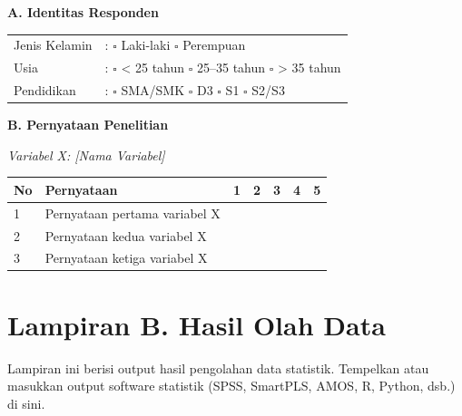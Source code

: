 \vspace{0.5cm}

\noindent\textbf{A. Identitas Responden}

\vspace{0.3cm}

\noindent
\begin{tabular}{ll}
Jenis Kelamin & : $\square$ Laki-laki \quad $\square$ Perempuan \\[0.3cm]
Usia          & : $\square$ < 25 tahun \quad $\square$ 25--35 tahun \quad $\square$ > 35 tahun \\[0.3cm]
Pendidikan    & : $\square$ SMA/SMK \quad $\square$ D3 \quad $\square$ S1 \quad $\square$ S2/S3 \\
\end{tabular}

\vspace{0.5cm}

\noindent\textbf{B. Pernyataan Penelitian}

\vspace{0.3cm}

\noindent\textit{Variabel X: [Nama Variabel]}

\begin{table}[H]
\begin{isitable}
\begin{tabular}{p{0.5cm} p{5.5cm} p{1cm} p{1cm} p{1cm} p{1cm} p{1cm}}
\toprule
\textbf{No} & \textbf{Pernyataan} & \textbf{1} & \textbf{2} & \textbf{3} & \textbf{4} & \textbf{5} \\
\midrule
1 & Pernyataan pertama variabel X & & & & & \\
2 & Pernyataan kedua variabel X & & & & & \\
3 & Pernyataan ketiga variabel X & & & & & \\
\bottomrule
\end{tabular}
\end{isitable}
\end{table}

\clearpage
\section*{Lampiran B. Hasil Olah Data}
\label{lampiran:olah-data}

Lampiran ini berisi output hasil pengolahan data statistik. Tempelkan atau masukkan
output software statistik (SPSS, SmartPLS, AMOS, R, Python, dsb.) di sini.


